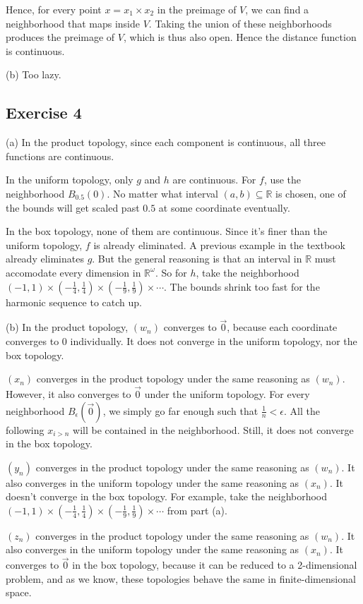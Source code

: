 \documentclass{book}
\begin{document}
Hence, for every point $x = x_1 \times x_2$ in the preimage of $V$, we can find a neighborhood that maps inside $V$. Taking the union of these neighborhoods produces the preimage of $V$, which is thus also open. Hence the distance function is continuous.

\noindent
(b)
Too lazy.

\subsection*{Exercise 4}
(a)
In the product topology, since each component is continuous, all three functions are continuous.

In the uniform topology, only $g$ and $h$ are continuous. For $f$, use the neighborhood $B_{0.5}(0)$. No matter what interval $(a, b) \subseteq \mathbb{R}$ is chosen, one of the bounds will get scaled past $0.5$ at some coordinate eventually.

In the box topology, none of them are continuous. Since it's finer than the uniform topology, $f$ is already eliminated. A previous example in the textbook already eliminates $g$. But the general reasoning is that an interval in $\mathbb{R}$ must accomodate every dimension in $\mathbb{R}^\omega$. So for $h$, take the neighborhood $(-1, 1) \times (-\frac{1}{4}, \frac{1}{4}) \times (-\frac{1}{9}, \frac{1}{9}) \times \cdots$. The bounds shrink too fast for the harmonic sequence to catch up.

\noindent
(b)
In the product topology, $(w_n)$ converges to $\vec{0}$, because each coordinate converges to $0$ individually. It does not converge in the uniform topology, nor the box topology.

$(x_n)$ converges in the product topology under the same reasoning as $(w_n)$. However, it also converges to $\vec{0}$ under the uniform topology. For every neighborhood $B_\epsilon (\vec{0})$, we simply go far enough such that $\frac{1}{n} < \epsilon$. All the following $x_{i > n}$ will be contained in the neighborhood. Still, it does not converge in the box topology.

$(y_n)$ converges in the product topology under the same reasoning as $(w_n)$. It also converges in the uniform topology under the same reasoning as $(x_n)$. It doesn't converge in the box topology. For example, take the neighborhood $(-1, 1) \times (-\frac{1}{4}, \frac{1}{4}) \times (-\frac{1}{9}, \frac{1}{9}) \times \cdots$ from part (a).

$(z_n)$ converges in the product topology under the same reasoning as $(w_n)$. It also converges in the uniform topology under the same reasoning as $(x_n)$. It converges to $\vec{0}$ in the box topology, because it can be reduced to a 2-dimensional problem, and as we know, these topologies behave the same in finite-dimensional space.
\end{document}
